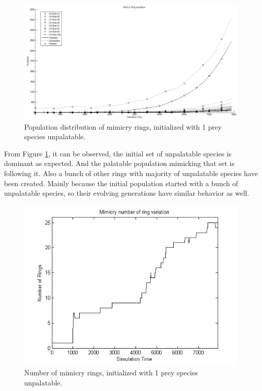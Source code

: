\begin{figure}[H]
	\centering
	\includegraphics[scale=0.40]{images/simTime8k-1-unp}
	\caption{Population distribution of mimicry rings, initialized with 1 prey species unpalatable.}
	\label{fig:plot-1-prey-unp}
\end{figure}

From Figure \ref{fig:plot-1-prey-unp}, it can be observed, the initial set of unpalatable species is dominant as expected. And the palatable population mimicking that set is following it. Also a bunch of other rings with majority of unpalatable species have been created. Mainly because the initial population started with a bunch of unpalatable species, so their evolving generations have similar behavior as well.

\begin{figure}[H]
	\centering
	\includegraphics[scale=0.50]{images/ringSize8k-1Prey-unp}
	\caption{Number of mimicry rings, initialized with 1 prey species unpalatable.}
	\label{fig:ringSize8k-1-Prey-unp}
\end{figure}

